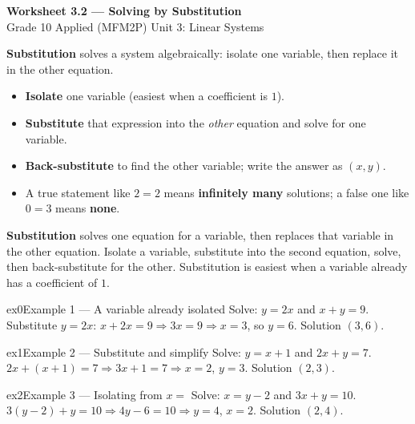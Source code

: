 \documentclass[11pt]{article}
\begin{document}
\begin{center}
{\LARGE\bfseries\color{titleblue}Worksheet 3.2 --- Solving by Substitution}\\[2pt]
{\small Grade 10 Applied (MFM2P) \textperiodcentered{} Unit 3: Linear Systems}
\end{center}

\begin{ideabox}
\textbf{Substitution} solves a system algebraically: isolate one variable, then replace it in the other equation.
\begin{itemize}[leftmargin=*,itemsep=2pt]
  \item \textbf{Isolate} one variable (easiest when a coefficient is $1$).
  \item \textbf{Substitute} that expression into the \emph{other} equation and solve for one variable.
  \item \textbf{Back-substitute} to find the other variable; write the answer as $(x,y)$.
  \item A true statement like $2=2$ means \textbf{infinitely many} solutions; a false one like $0=3$ means \textbf{none}.
\end{itemize}
\end{ideabox}

\begin{learnbox}
\textbf{Substitution} solves one equation for a variable, then replaces that variable in the other equation.
Isolate a variable, substitute into the second equation, solve, then back-substitute for the other.
Substitution is easiest when a variable already has a coefficient of $1$.
\end{learnbox}


\begin{example}{ex0}{Example 1 --- A variable already isolated}
Solve: $y=2x$ and $x+y=9$.
\soln Substitute $y=2x$: $x+2x=9\Rightarrow 3x=9\Rightarrow x=3$, so $y=6$. Solution $(3,6)$.
\end{example}

\begin{example}{ex1}{Example 2 --- Substitute and simplify}
Solve: $y=x+1$ and $2x+y=7$.
\soln $2x+(x+1)=7\Rightarrow 3x+1=7\Rightarrow x=2$, $y=3$. Solution $(2,3)$.
\end{example}

\begin{example}{ex2}{Example 3 --- Isolating from $x=$}
Solve: $x=y-2$ and $3x+y=10$.
\soln $3(y-2)+y=10\Rightarrow 4y-6=10\Rightarrow y=4$, $x=2$. Solution $(2,4)$.
\end{example}
\end{document}

